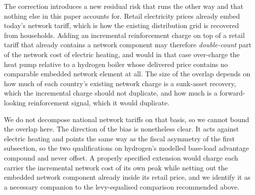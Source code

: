 The correction introduces a new residual risk that runs the other way and that nothing
else in this paper accounts for. Retail electricity prices already embed today's network
tariff, which is how the existing distribution grid is recovered from households. Adding
an incremental reinforcement charge on top of a retail tariff that already contains a
network component may therefore \emph{double-count} part of the network cost of electric
heating, and would in that case over-charge the heat pump relative to a hydrogen boiler
whose delivered price contains no comparable embedded network element at all. The size
of the overlap depends on how much of each country's existing network charge is a
sunk-asset recovery, which the incremental charge should not duplicate, and how much is
a forward-looking reinforcement signal, which it would duplicate.

We do not decompose national network tariffs on that basis, so we cannot bound the
overlap here. The direction of the bias is nonetheless clear. It acts against electric
heating and points the same way as the fiscal asymmetry of the first subsection, so the
two qualifications on hydrogen's modelled base-load advantage compound and never offset.
A properly specified extension would charge each carrier the incremental network cost of
its own peak while netting out the embedded network component already inside its retail
price, and we identify it as a necessary companion to the levy-equalised comparison
recommended above.
